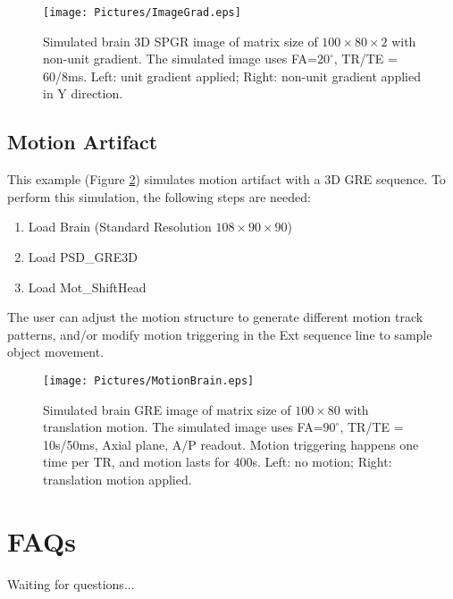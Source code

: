 \documentclass{book}%
\begin{document}
\begin{figure}[htbp]
	\centering
		\texttt{[image: Pictures/ImageGrad.eps]}
	\caption{Simulated brain 3D SPGR image of matrix size of $100 \times 80 \times 2$ with non-unit gradient. The simulated image uses FA=$20^{\circ}$, TR/TE = 60/8ms. Left: unit gradient applied; Right: non-unit gradient applied in Y direction.}
	\label{fig:ImageGrad}
\end{figure}

\section{Motion Artifact}

This example (Figure \ref{fig:MotionBrain}) simulates motion artifact with a 3D GRE sequence. To perform this simulation, the following steps are needed:

\begin{enumerate}
	\item Load Brain (Standard Resolution $108 \times 90 \times 90$)
  \item Load PSD\_GRE3D
	\item Load Mot\_ShiftHead
\end{enumerate}

The user can adjust the motion structure to generate different motion track patterns, and/or modify motion triggering in the Ext sequence line to sample object movement.

\begin{figure}[htbp]
	\centering
		\texttt{[image: Pictures/MotionBrain.eps]}
	\caption{Simulated brain GRE image of matrix size of $100 \times 80$ with translation motion. The simulated image uses FA=$90^{\circ}$, TR/TE = 10s/50ms, Axial plane, A/P readout. Motion triggering happens one time per TR, and motion lasts for 400s. Left: no motion; Right: translation motion applied.}
	\label{fig:MotionBrain}
\end{figure}

\chapter{FAQs}
Waiting for questions...
\end{document}
